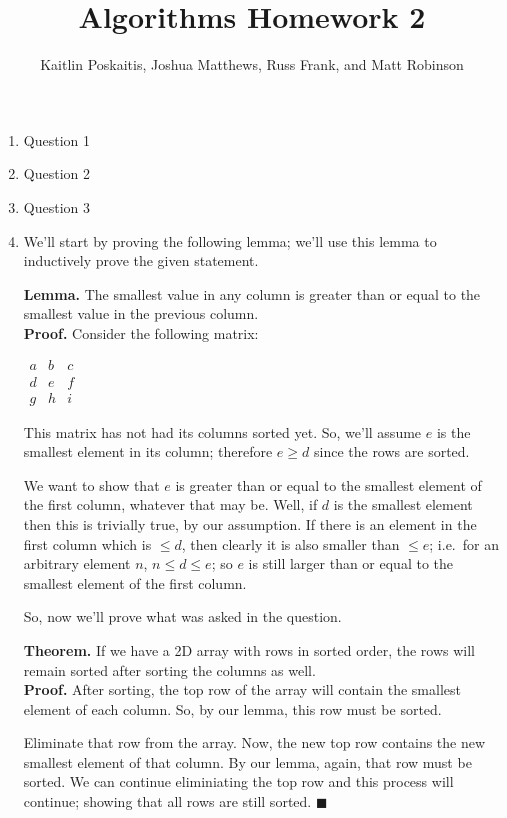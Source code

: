 \documentclass[12pt]{article}
\title{\bf Algorithms Homework 2}
\author{Kaitlin Poskaitis, Joshua Matthews, Russ Frank, and Matt Robinson}
\date{}
\begin{document}
\maketitle

\begin{enumerate}

\item Question 1

\item Question 2

\item Question 3

\item 

  We'll start by proving the following lemma; we'll use this lemma to
  inductively prove the given statement.

  \textbf{Lemma.} The smallest value in any column is greater than or equal to
  the smallest value in the previous column.\\
  \textbf{Proof.} Consider the following matrix:

  $\begin{matrix}
    a & b & c \\
    d & e & f \\
    g & h & i
  \end{matrix}$

  This matrix has not had its columns sorted yet. So, we'll assume $e$ is the
  smallest element in its column; therefore $e \ge d$ since the rows are sorted.

  We want to show that $e$ is greater than or equal to the smallest element of the first
  column, whatever that may be. Well, if $d$ is the smallest element then this
  is trivially true, by our assumption. If there is an element in the first
  column which is $\le d$, then clearly it is also smaller than $\le e$;
  i.e.\ for an arbitrary element $n$, $n \le d \le e$; so $e$ is still larger 
  than or equal to the smallest element of the first column.

  So, now we'll prove what was asked in the question.

  \textbf{Theorem.} If we have a 2D array with rows in sorted order, the rows
  will remain sorted after sorting the columns as well. \\
  \textbf{Proof.} After sorting, the top row of the array will contain the
  smallest element of each column. So, by our lemma, this row must be sorted.

  Eliminate that row from the array. Now, the new top row contains the new
  smallest element of that column. By our lemma, again, that row must be
  sorted. We can continue eliminiating the top row and this process will
  continue; showing that all rows are still sorted. $\blacksquare$


\end{enumerate}
\end{document}
